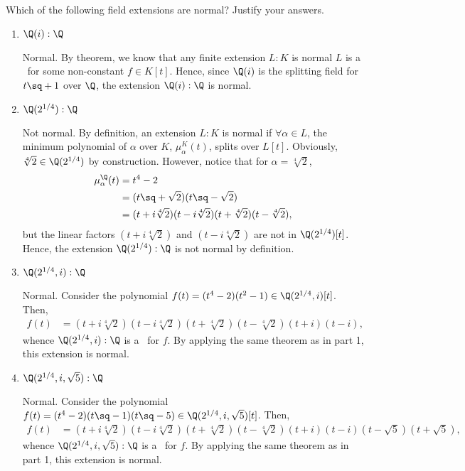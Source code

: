 \documentclass{article}
\begin{document}
\setcounter{section}{5} %
\begin{exercise}
Which of the following field extensions are normal? Justify your answers.
\end{exercise}
\begin{enumerate}
\item \( \Q(i):\Q \) %
\begin{solution}
Normal.
By theorem, we know that any finite extension \( L:K \) is normal \iff \( L \) is a \sfe~for some non-constant \( f\in K[t] \).
Hence, since \( \Q(i) \) is the splitting field for \( t\sq+1 \) over \( \Q \), the extension \( \Q(i):\Q \) is normal.
\end{solution}

\item \( \Q(2^{1/4}):\Q \) %
\begin{solution}
Not normal.
By definition, an extension \( L:K \) is normal if \( \forall \alpha\in L \), the minimum polynomial of \( \alpha \) over \( K \), \( \mu_\alpha^K(t) \), splits over \( L[t] \).
Obviously, \( \sqrt[4]2 \in \Q(2^{1/4}) \) by construction.
However, notice that for \( \alpha=\sqrt[4]2 \), \begin{align*}
  \mu_\alpha^\Q(t) &= t^4-2 \\
  &= (t\sq+\sqrt 2)(t\sq-\sqrt 2) \\
  &= (t+i\sqrt[4]2)(t-i\sqrt[4]2)(t+\sqrt[4]2)(t-\sqrt[4]2),
\end{align*}
but the linear factors \( (t+i\sqrt[4]2) \) and \( (t-i\sqrt[4]2) \) are not in \( \Q(2^{1/4})[t] \). Hence, the extension \( \Q(2^{1/4}):\Q \) is not normal by definition.
\end{solution}

\item \( \Q(2^{1/4},i):\Q \) %
\begin{solution}
Normal.
Consider the polynomial \( f(t) = (t^4-2)(t^2-1) \in \Q(2^{1/4},i)[t] \).
Then, \begin{align*}
  f(t) &= (t+i\sqrt[4]2)(t-i\sqrt[4]2)(t+\sqrt[4]2)(t-\sqrt[4]2)(t+i)(t-i),
\end{align*}
whence \( \Q(2^{1/4},i):\Q \) is a \sfe~for \( f \).
By applying the same theorem as in part 1, this extension is normal.
\end{solution}

\item \( \Q(2^{1/4},i,\sqrt 5):\Q \) %
\begin{solution}
Normal.
Consider the polynomial \( f(t) = (t^4-2)(t\sq-1)(t\sq-5) \in \Q(2^{1/4},i,\sqrt 5)[t] \).
Then, \begin{align*}
  f(t) &= (t+i\sqrt[4]2)(t-i\sqrt[4]2)(t+\sqrt[4]2)(t-\sqrt[4]2)(t+i)(t-i)(t-\sqrt 5)(t+\sqrt 5),
\end{align*}
whence \( \Q(2^{1/4},i,\sqrt 5):\Q \) is a \sfe~for \( f \).
By applying the same theorem as in part 1, this extension is normal.
\end{solution}


\end{enumerate}
\end{document}
